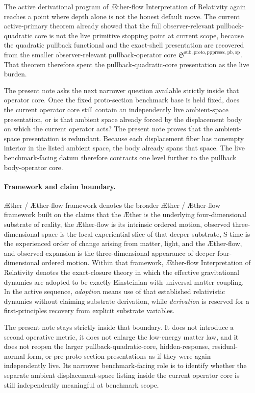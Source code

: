 \documentclass[11pt]{article}
\newcommand{\Aether}{\AE{}ther}
\newcommand{\Aflow}{\AE{}ther-flow}
\newcommand{\TheoryName}{\Aflow{} Interpretation of Relativity}
\newcommand{\TheoryProgram}{\Aether{} / \Aflow{} framework}
\newcommand{\PullbackOperatorCore}{\mathfrak S^{\mathrm{sub,proto,pppresec,pb,op}}}
\begin{document}
The active derivational program of \TheoryName{} again reaches a point where depth alone is not the honest default move. The current active-primary theorem already showed that the full observer-relevant pullback-quadratic core is not the live primitive stopping point at current scope, because the quadratic pullback functional and the exact-shell presentation are recovered from the smaller observer-relevant pullback-operator core \(\PullbackOperatorCore\). That theorem therefore spent the pullback-quadratic-core presentation as the live burden.

The present note asks the next narrower question available strictly inside that operator core. Once the fixed proto-section benchmark base is held fixed, does the current operator core still contain an independently live ambient-space presentation, or is that ambient space already forced by the displacement body on which the current operator acts? The present note proves that the ambient-space presentation is redundant. Because each displacement fiber has nonempty interior in the listed ambient space, the body already spans that space. The live benchmark-facing datum therefore contracts one level further to the pullback body-operator core.

\paragraph{Framework and claim boundary.}
\TheoryProgram{} denotes the broader \Aether{} / \Aflow{} framework built on the claims that the \Aether{} is the underlying four-dimensional substrate of reality, the \Aflow{} is its intrinsic ordered motion, observed three-dimensional space is the local experiential slice of that deeper substrate, S-time is the experienced order of change arising from matter, light, and the \Aflow{}, and observed expansion is the three-dimensional appearance of deeper four-dimensional ordered motion. Within that framework, \TheoryName{} denotes the exact-closure theory in which the effective gravitational dynamics are adopted to be exactly Einsteinian with universal matter coupling. In the active sequence, \emph{adoption} means use of that established relativistic dynamics without claiming substrate derivation, while \emph{derivation} is reserved for a first-principles recovery from explicit substrate variables.

The present note stays strictly inside that boundary. It does not introduce a second operative metric, it does not enlarge the low-energy matter law, and it does not reopen the larger pullback-quadratic-core, hidden-response, residual-normal-form, or pre-proto-section presentations as if they were again independently live. Its narrower benchmark-facing role is to identify whether the separate ambient displacement-space listing inside the current operator core is still independently meaningful at benchmark scope.
\end{document}
